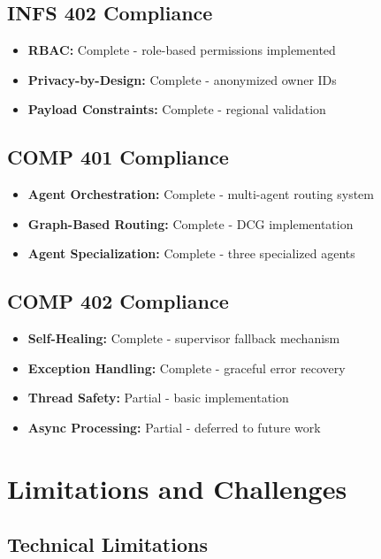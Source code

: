 \subsection{INFS 402 Compliance}

\begin{itemize}
    \item \textbf{RBAC:} Complete - role-based permissions implemented
    \item \textbf{Privacy-by-Design:} Complete - anonymized owner IDs
    \item \textbf{Payload Constraints:} Complete - regional validation
\end{itemize}

\subsection{COMP 401 Compliance}

\begin{itemize}
    \item \textbf{Agent Orchestration:} Complete - multi-agent routing system
    \item \textbf{Graph-Based Routing:} Complete - DCG implementation
    \item \textbf{Agent Specialization:} Complete - three specialized agents
\end{itemize}

\subsection{COMP 402 Compliance}

\begin{itemize}
    \item \textbf{Self-Healing:} Complete - supervisor fallback mechanism
    \item \textbf{Exception Handling:} Complete - graceful error recovery
    \item \textbf{Thread Safety:} Partial - basic implementation
    \item \textbf{Async Processing:} Partial - deferred to future work
\end{itemize}

\section{Limitations and Challenges}

\subsection{Technical Limitations}

